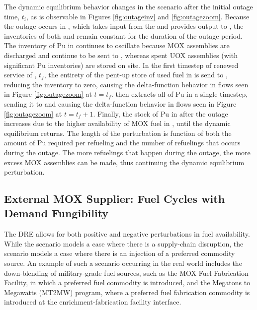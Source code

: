 The dynamic equilibrium behavior changes in the \outage scenario after the
initial outage time, $t_i$, as is observable in Figures \ref{fig:outageinv} and
\ref{fig:outagezoom}. Because the outage occurs in \separations, which takes
input from the \reactors and provides output to \fabrication, the inventories of
both \separations and \fabrication remain constant for the duration of the
outage period. The inventory of Pu in \reactors continues to oscillate
because MOX assemblies are discharged and continue to be sent to \storage,
whereas spent UOX assemblies (with significant Pu inventories) are stored on
site. In the first timestep of renewed service of \separations, $t_f$, the
entirety of the pent-up store of used fuel in \reactors is send to \separations,
reducing the inventory to zero, causing the delta-function behavior in \reactor
flows seen in Figure \ref{fig:outagezoom} at $t = t_f$. \separations then
extracts all of Pu in a single timestep, sending it to \fabrication and
causing the delta-function behavior in \separations flows seen in Figure
\ref{fig:outagezoom} at $t = t_f + 1$. Finally, the stock of Pu in \reactors
after the outage increases due to the higher availability of MOX fuel in
\fabrication, until the dynamic equilibrium returns. The length of the
perturbation is function of both the amount of Pu required per refueling and
the number of refuelings that occurs during the outage. The more refuelings that
happen during the outage, the more excess MOX assemblies can be made, thus
continuing the dynamic equilibrium perturbation.

\subsection{External MOX Supplier: Fuel Cycles with Demand Fungibility}

The DRE allows for both positive and negative perturbations in fuel
availability. While the \outage scenario models a case where there is a
supply-chain disruption, the \external scenario models a case where there is an
injection of a preferred commodity source. An example of such a scenario
occurring in the real world includes the down-blending of military-grade fuel
sources, such as the MOX Fuel Fabrication Facility, in which a preferred fuel
commodity is introduced, and the Megatons to Megawatts (MT2MW) program, where a
preferred fuel fabrication commodity is introduced at the enrichment-fabrication
facility interface.

